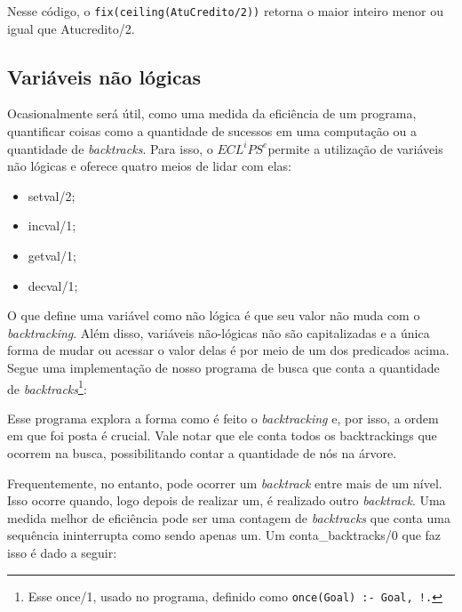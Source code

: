 \documentclass{article}
\newcommand{\eclipse}{$ECL^iPS^e$}
\begin{document}


Nesse código, o {\tt fix(ceiling(AtuCredito/2))} retorna o maior inteiro menor ou igual que Atucredito/2.

\subsection{Variáveis não lógicas}

  Ocasionalmente será útil, como uma medida da eficiência de um programa, quantificar coisas como a quantidade de sucessos em uma computação ou a quantidade de \textit{backtracks}. Para isso, o \eclipse permite a utilização de variáveis não lógicas e oferece quatro meios de lidar com elas:

  \begin{itemize}
    \item setval/2;
    \item incval/1;
    \item getval/1;
    \item decval/1;
  \end{itemize}

  O que define uma variável como não lógica é que seu valor não muda com o \textit{backtracking}. Além disso, variáveis não-lógicas não são capitalizadas e a única forma de mudar ou acessar o valor delas é por meio de um dos predicados acima. Segue uma implementação de nosso programa de busca que conta a quantidade de \textit{backtracks}\footnote{Esse once/1, usado no programa, definido como {\tt once(Goal) :- Goal, !.}}:



Esse programa explora a forma como é feito o \textit{backtracking} e, por isso, a ordem em que foi posta é crucial. Vale notar que ele conta todos os backtrackings que ocorrem na busca, possibilitando contar a quantidade de nós na árvore.

Frequentemente, no entanto, pode ocorrer um \textit{backtrack} entre mais de um nível. Isso ocorre quando, logo depois de realizar um, é realizado outro \textit{backtrack}. Uma medida melhor de eficiência pode ser uma contagem de \textit{backtracks} que conta uma sequência ininterrupta como sendo apenas um. Um conta\_backtracks/0 que faz isso é dado a seguir:


\end{document}
